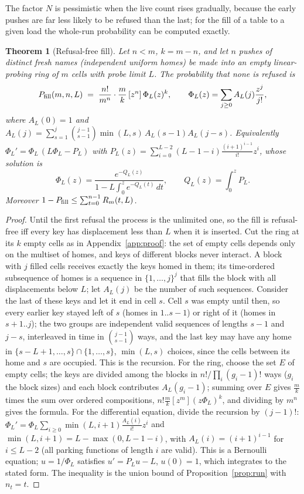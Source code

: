 \documentclass[11pt,a4paper]{article}
\newtheorem{theorem}{Theorem}
\theoremstyle{definition}
\theoremstyle{remark}
\begin{document}
The factor $N$ is pessimistic when the live count rises gradually, because the early pushes are far less likely to be refused than the last; for the fill of a table to a given load the whole-run probability can be computed exactly.

\begin{theorem}[Refusal-free fill]\label{thm:fill}
Let $n<m$, $k=m-n$, and let $n$ pushes of distinct fresh names (independent uniform homes) be made into an empty linear-probing ring of $m$ cells with probe limit $L$. The probability that none is refused is
\[
P_{\rm fill}(m,n,L)\;=\;\frac{n!}{m^{n}}\cdot\frac mk\,[z^{n}]\,\Phi_L(z)^{k},\qquad \Phi_L(z)=\sum_{j\ge0}A_L(j)\frac{z^j}{j!},
\]
where $A_L(0)=1$ and $A_L(j)=\sum_{s=1}^{j}\binom{j-1}{s-1}\min(L,s)\,A_L(s-1)A_L(j-s)$. Equivalently $\Phi_L'=\Phi_L\,(L\Phi_L-P_L)$ with $P_L(z)=\sum_{i=0}^{L-2}(L-1-i)\frac{(i+1)^{i-1}}{i!}z^i$, whose solution is
\[
\Phi_L(z)=\frac{e^{-Q_L(z)}}{1-L\int_0^{z}e^{-Q_L(t)}\,dt},\qquad Q_L(z)=\int_0^zP_L .
\]
Moreover $1-P_{\rm fill}\le\sum_{t=0}^{n-1}R_m(t,L)$.
\end{theorem}
\begin{proof}
Until the first refusal the process is the unlimited one, so the fill is refusal-free iff every key has displacement less than $L$ when it is inserted. Cut the ring at its $k$ empty cells as in Appendix~\ref{app:proof}: the set of empty cells depends only on the multiset of homes, and keys of different blocks never interact. A block with $j$ filled cells receives exactly the keys homed in them; its time-ordered subsequence of homes is a sequence in $\{1,\dots,j\}^j$ that fills the block with all displacements below $L$; let $A_L(j)$ be the number of such sequences. Consider the last of these keys and let it end in cell $s$. Cell $s$ was empty until then, so every earlier key stayed left of $s$ (homes in $1..s-1$) or right of it (homes in $s+1..j$); the two groups are independent valid sequences of lengths $s-1$ and $j-s$, interleaved in time in $\binom{j-1}{s-1}$ ways, and the last key may have any home in $\{s-L+1,\dots,s\}\cap\{1,\dots,s\}$, $\min(L,s)$ choices, since the cells between its home and $s$ are occupied. This is the recursion. For the ring, choose the set $E$ of empty cells; the keys are divided among the blocks in $n!/\prod_i(g_i-1)!$ ways ($g_i$ the block sizes) and each block contributes $A_L(g_i-1)$; summing over $E$ gives $\frac mk$ times the sum over ordered compositions, $n!\frac mk[z^m](z\Phi_L)^k$, and dividing by $m^n$ gives the formula. For the differential equation, divide the recursion by $(j-1)!$: $\Phi_L'=\Phi_L\sum_{i\ge0}\min(L,i+1)\frac{A_L(i)}{i!}z^i$ and $\min(L,i+1)=L-\max(0,L-1-i)$, with $A_L(i)=(i+1)^{i-1}$ for $i\le L-2$ (all parking functions of length $i$ are valid). This is a Bernoulli equation; $u=1/\Phi_L$ satisfies $u'=P_Lu-L$, $u(0)=1$, which integrates to the stated form. The inequality is the union bound of Proposition~\ref{prop:run} with $n_t=t$.
\end{proof}
\end{document}
